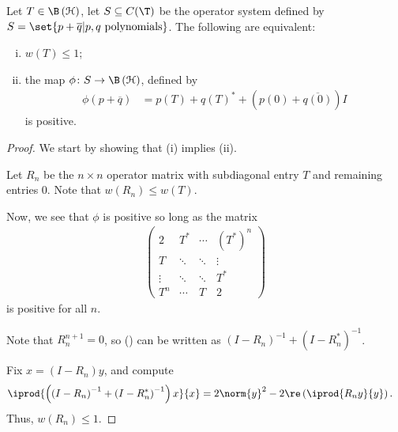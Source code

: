 \documentclass[10pt]{mypackage}
\begin{document}
\begin{theorem}
  Let $T\in \B\left( \mathcal{H} \right)$, let $S\subseteq C(\T)$ be the operator system defined by $S = \set{p + \overline{q} | p,q\text{ polynomials}}$. The following are equivalent:
  \begin{enumerate}[(i)]
    \item $w(T)\leq 1$;
    \item the map $\phi\colon S\rightarrow \B\left( \mathcal{H} \right)$, defined by
      \begin{align*}
        \phi\left( p + \overline{q} \right) &= p(T) + q\left( T \right)^{\ast} + \left( p(0) + \overline{q(0)} \right) I
      \end{align*}
      is positive.
  \end{enumerate}
\end{theorem}
\begin{proof}
  We start by showing that (i) implies (ii).\newline

  Let $R_n$ be the $n\times n$ operator matrix with subdiagonal entry $T$ and remaining entries $0$. Note that $w\left( R_n \right)\leq w(T)$.\newline

  Now, we see that $\phi$ is positive so long as the matrix
  \begin{align*}
    \begin{pmatrix}2 & T^{\ast} & \cdots & \left( T^{\ast} \right)^n\\ T & \ddots & \ddots & \vdots \\ \vdots & \ddots & \ddots & T^{\ast} \\ T^n & \cdots & T & 2\end{pmatrix}\tag{\textasteriskcentered}
  \end{align*}
  is positive for all $n$.\newline

  Note that $R_n^{n+1} = 0$, so (\textasteriskcentered) can be written as $\left( I - R_n \right)^{-1} + \left( I - R_n^{\ast} \right)^{-1}$.\newline

  Fix $x = \left( I - R_n \right)y$, and compute
  \begin{align*}
    \iprod{\left( \left( I-R_n \right)^{-1} + \left( I - R_n^{\ast} \right)^{-1} \right)x}{x} &= 2\norm{y}^2 - 2\re \left( \iprod{R_n y}{y} \right).
  \end{align*}
  Thus, $w\left( R_n \right) \leq 1$.
\end{proof}
\end{document}
